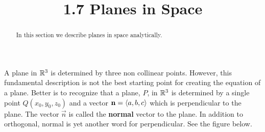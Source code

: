 \documentclass[handout]{ximera}
\title{1.7 Planes in Space}
\begin{document}
\begin{abstract}
In this section we describe planes in space analytically.
\end{abstract}
 
\maketitle

A plane in $\mathbb R^3$ is determined by three non collinear points. 
However, this fundamental description is not the best starting point for creating the equation of a plane.
Better is to recognize that a plane, $P$, in $\mathbb R^3$ is determined by a single point $Q(x_0, y_0, z_0)$ and a 
vector $\mathbf{n} = \left\langle a, b, c\right\rangle$ which is perpendicular to the plane. 
The vector $\vec{n}$ is called the {\bf normal} vector to the plane.
In addition to orthogonal, normal is yet another word for perpendicular.
See the figure below.

\begin{image}
\end{image}
\end{document}
